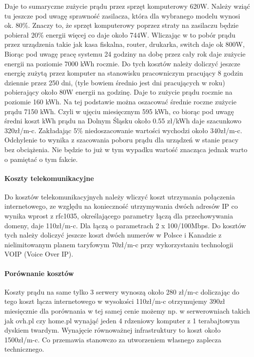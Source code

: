 				\par Daje to sumaryczne zużycie prądu przez sprzęt komputerowy 620W. Należy wziąć tu jeszcze pod uwagę sprawność zasilacza, która dla wybranego modelu wynosi ok. 80\%. Znaczy to, że sprzęt komputerowy poprzez straty na zasilaczu będzie pobierał 20\% energii więcej co daje około 744W. Wliczając w to pobór prądu przez urządzenia takie jak kasa fiskalna, router, drukarka, switch daje ok 800W, Biorąc pod uwagę pracę systemu 24 godziny na dobę przez cały rok daje zużycie energii na poziomie 7000 kWh rocznie. Do tych kosztów należy doliczyć jeszcze energię zużytą przez komputer na stanowisku pracowniczym pracujący 8 godzin dziennie przez 250 dni, (tyle bowiem średnio jest dni pracujących w roku) pobierający około 80W energii na godzinę. Daje to zużycie prądu rocznie na poziomie 160 kWh. Na tej podstawie można oszacować średnie roczne zużycie prądu 7150 kWh. Czyli w ujęciu miesięcznym 595 kWh, co biorąc pod uwagę średni koszt kWh prądu na Dolnym Śląsku około 0.55 zł/kWh daje szacunkowo 320zł/m-c. Zakładając 5\% niedoszacowanie wartości wychodzi około 340zł/m-c. Odchylenie to wynika z szacowania poboru prądu dla urządzeń w stanie pracy bez obciążenia. Nie będzie to już w tym wypadku wartość znacząca jednak warto o pamiętać o tym fakcie.

			\paragraph{Koszty telekomunikacyjne}
				\par Do kosztów telekomunikacyjnych należy wliczyć koszt utrzymania połączenia internetowego, ze względu na konieczność utrzymywania dwóch adresów IP co wynika wprost z rfc1035, określającego parametry łączą dla przechowywania domeny, daje 110zł/m-c. Dla łączą o parametrach 2 x 100/100Mbps. Do kosztów tych należy doliczyć jeszcze koszt dwóch numerów w Polsce i Kanadzie z nielimitowanym planem taryfowym 70zł/m-c przy wykorzystaniu technologii VOIP (Voice Over IP).
		
			\paragraph{Porównanie kosztów}
				\par Koszty prądu na same tylko 3 serwery wynoszą około 280 zł/m-c doliczając do tego koszt łącza internetowego w wysokości 110zł/m-c otrzymujemy 390zł miesięcznie  dla porównania w tej samej cenie możemy np. w serwerowniach takich jak ovh.pl czy home.pl wynająć jeden 4 rdzeniowy komputer z 1 terabajtowym dyskiem twardym. Wynajęcie równoważnej infrastruktury to koszt około 1500zł/m-c. Co przemawia stanowczo za utworzeniem własnego zaplecza technicznego. 
 
